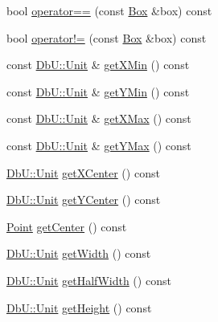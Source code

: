 \begin{DoxyCompactItemize}
\item 
bool \mbox{\hyperlink{classHurricane_1_1Box_a2a363ad0fdfda5a2f56b1b62a8665703}{operator==}} (const \mbox{\hyperlink{classHurricane_1_1Box}{Box}} \&box) const
\item 
bool \mbox{\hyperlink{classHurricane_1_1Box_a77a0e8c424c246973c455ce8e3ada8fb}{operator!=}} (const \mbox{\hyperlink{classHurricane_1_1Box}{Box}} \&box) const
\item 
const \mbox{\hyperlink{group__DbUGroup_ga4fbfa3e8c89347af76c9628ea06c4146}{Db\+U\+::\+Unit}} \& \mbox{\hyperlink{classHurricane_1_1Box_ad5122ef7dda8a58c1dacddb57cd4ccfb}{get\+X\+Min}} () const
\item 
const \mbox{\hyperlink{group__DbUGroup_ga4fbfa3e8c89347af76c9628ea06c4146}{Db\+U\+::\+Unit}} \& \mbox{\hyperlink{classHurricane_1_1Box_a542c383466845aeca0e32f51b77c7439}{get\+Y\+Min}} () const
\item 
const \mbox{\hyperlink{group__DbUGroup_ga4fbfa3e8c89347af76c9628ea06c4146}{Db\+U\+::\+Unit}} \& \mbox{\hyperlink{classHurricane_1_1Box_a77b9db757080544fcede3e670cee8c5c}{get\+X\+Max}} () const
\item 
const \mbox{\hyperlink{group__DbUGroup_ga4fbfa3e8c89347af76c9628ea06c4146}{Db\+U\+::\+Unit}} \& \mbox{\hyperlink{classHurricane_1_1Box_a06e1a86a06dacfca6d3403c16affc7e8}{get\+Y\+Max}} () const
\item 
\mbox{\hyperlink{group__DbUGroup_ga4fbfa3e8c89347af76c9628ea06c4146}{Db\+U\+::\+Unit}} \mbox{\hyperlink{classHurricane_1_1Box_a95f35cd33966aad61bb43662306ccf98}{get\+X\+Center}} () const
\item 
\mbox{\hyperlink{group__DbUGroup_ga4fbfa3e8c89347af76c9628ea06c4146}{Db\+U\+::\+Unit}} \mbox{\hyperlink{classHurricane_1_1Box_a659820726e3862a70158b6f5b7644da0}{get\+Y\+Center}} () const
\item 
\mbox{\hyperlink{classHurricane_1_1Point}{Point}} \mbox{\hyperlink{classHurricane_1_1Box_ac18c8725989166d1b101de29531e4f6e}{get\+Center}} () const
\item 
\mbox{\hyperlink{group__DbUGroup_ga4fbfa3e8c89347af76c9628ea06c4146}{Db\+U\+::\+Unit}} \mbox{\hyperlink{classHurricane_1_1Box_ae2cc9cf0b17e6443a88b475bbd36e4c9}{get\+Width}} () const
\item 
\mbox{\hyperlink{group__DbUGroup_ga4fbfa3e8c89347af76c9628ea06c4146}{Db\+U\+::\+Unit}} \mbox{\hyperlink{classHurricane_1_1Box_a8aa689ad799e4c78bfefb0328e7d9081}{get\+Half\+Width}} () const
\item 
\mbox{\hyperlink{group__DbUGroup_ga4fbfa3e8c89347af76c9628ea06c4146}{Db\+U\+::\+Unit}} \mbox{\hyperlink{classHurricane_1_1Box_a7b15b9488d49da1fc666c0383fb213ab}{get\+Height}} () const

\end{DoxyCompactItemize}
